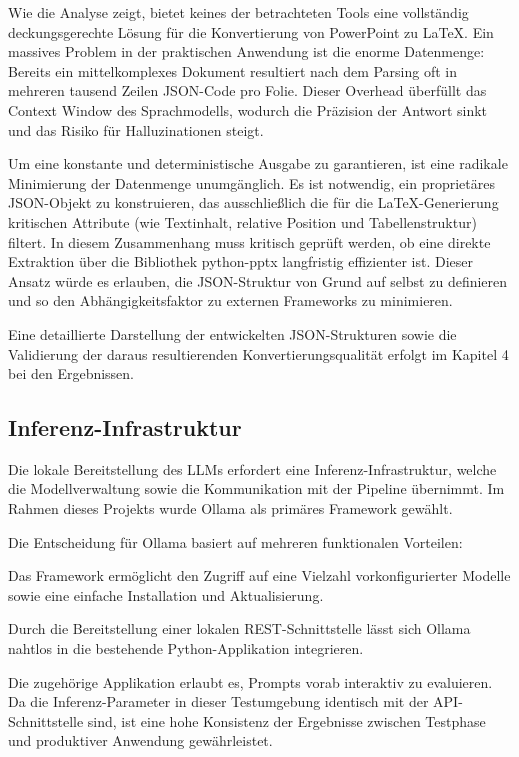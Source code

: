 \documentclass[a4paper]{article}
\begin{document}
Wie die Analyse zeigt, bietet keines der betrachteten Tools eine vollständig deckungsgerechte Lösung für die Konvertierung von PowerPoint zu LaTeX. Ein massives Problem in der praktischen Anwendung ist die enorme Datenmenge: Bereits ein mittelkomplexes Dokument resultiert nach dem Parsing oft in mehreren tausend Zeilen JSON-Code pro Folie. Dieser Overhead überfüllt das Context Window des Sprachmodells, wodurch die Präzision der Antwort sinkt und das Risiko für Halluzinationen steigt.

Um eine konstante und deterministische Ausgabe zu garantieren, ist eine radikale Minimierung der Datenmenge unumgänglich. Es ist notwendig, ein proprietäres JSON-Objekt zu konstruieren, das ausschließlich die für die LaTeX-Generierung kritischen Attribute (wie Textinhalt, relative Position und Tabellenstruktur) filtert. In diesem Zusammenhang muss kritisch geprüft werden, ob eine direkte Extraktion über die Bibliothek python-pptx \citep{PythonPptxDoc} langfristig effizienter ist. Dieser Ansatz würde es erlauben, die JSON-Struktur von Grund auf selbst zu definieren und so den Abhängigkeitsfaktor zu externen Frameworks zu minimieren.

Eine detaillierte Darstellung der entwickelten JSON-Strukturen sowie die Validierung der daraus resultierenden Konvertierungsqualität erfolgt im Kapitel 4 bei den Ergebnissen.

\subsection{Inferenz-Infrastruktur}

Die lokale Bereitstellung des LLMs erfordert eine Inferenz-Infrastruktur, welche die Modellverwaltung sowie die Kommunikation mit der Pipeline übernimmt. Im Rahmen dieses Projekts wurde {Ollama} als primäres Framework gewählt. 

Die Entscheidung für Ollama basiert auf mehreren funktionalen Vorteilen:

Das Framework ermöglicht den Zugriff auf eine Vielzahl vorkonfigurierter Modelle sowie eine einfache Installation und Aktualisierung.

Durch die Bereitstellung einer lokalen REST-Schnittstelle lässt sich Ollama nahtlos in die bestehende Python-Applikation integrieren.

 Die zugehörige Applikation erlaubt es, Prompts vorab interaktiv zu evaluieren. Da die Inferenz-Parameter in dieser Testumgebung identisch mit der API-Schnittstelle sind, ist eine hohe Konsistenz der Ergebnisse zwischen Testphase und produktiver Anwendung gewährleistet.\\
\end{document}
